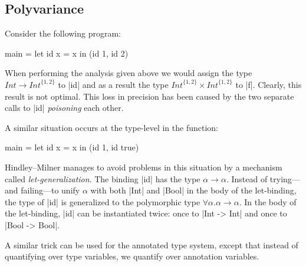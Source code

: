 \subsection{Polyvariance}



Consider the following program:
\begin{code}
main =  let id x = x
        in (id 1, id 2)
\end{code}

When performing the analysis given above we would assign the type $\mathit{Int} \to \mathit{Int}^{\{1, 2\}}$ to |id| and as a result the type $\mathit{Int}^{\{1,2\}} \times \mathit{Int}^{\{1,2\}}$ to |f|. Clearly, this result is not optimal. This loss in precision has been caused by the two separate calls to |id| \emph{poisoning} each other.

A similar situation occurs at the type-level in the function:
\begin{code}
main =  let id x = x
        in (id 1, id true)
\end{code}
Hindley--Milner manages to avoid problems in this situation by a mechanism called \emph{let-generalization}. The binding |id| has the type $\alpha \to \alpha$. Instead of trying---and failing---to unify $\alpha$ with both |Int| and |Bool| in the body of the let-binding, the type of |id| is generalized to the polymorphic type $\forall \alpha. \alpha \to \alpha$. In the body of the let-binding, |id| can be instantiated twice: once to |Int -> Int| and once to |Bool -> Bool|.

A similar trick can be used for the annotated type system, except that instead of quantifying over type variables, we quantify over annotation variables.
